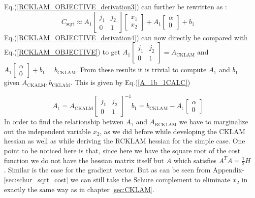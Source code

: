 Eq.(\ref{RCKLAM_OBJECTIVE_derivation3}) can further be rewritten as :
\begin{equation}
  C_\mathrm{sqrt}\approx A_1\begin{bmatrix}j_1 & j_2 \\ 0 & 1\end{bmatrix}\begin{bmatrix} x_1 \\ x_2 \end{bmatrix} + A_1\begin{bmatrix}\alpha \\ 0\end{bmatrix} + b_1
  \label{RCKLAM_OBJECTIVE_derivation4}
\end{equation}
Eq.(\ref{RCKLAM_OBJECTIVE_derivation4}) can now directly be compared with Eq.(\ref{RCKLAM_OBJECTIVE}) to get $A_1\begin{bmatrix}j_1 & j_2 \\ 0 & 1\end{bmatrix} = A_\mathrm{CKLAM}$ and $A_1\begin{bmatrix}\alpha \\ 0\end{bmatrix} + b_1 = b_\mathrm{CKLAM}$. From these results it is trivial to compute $A_1$ and $b_1$ given $A_\mathrm{CKALM} , b_\mathrm{CKLAM}$. This is given by Eq.(\ref{A_1b_1CALC})

\begin{subequations}
  \begin{equation}
    A_1 = A_\mathrm{CKALM}\begin{bmatrix}j_1 & j_2 \\ 0 & 1\end{bmatrix}^{-1}
  \end{equation}
  \begin{equation}
    b_1 = b_\mathrm{CKLAM} - A_1 \begin{bmatrix}\alpha \\ 0 \end{bmatrix}
  \end{equation}
  \label{A_1b_1CALC}
\end{subequations}
In order to find the relationship betwen $A_1$ and $A_\mathrm{RCKLAM}$ we have to marginalize out the independent variable $x_2$, as we did before while developing the CKLAM hessian as well as while deriving the RCKLAM hessian for the simple case. One point to be noticed here is that, since here we have the square root of the cost function we do not have the hessian matrix itself but $A$ which satisfies $A^TA = \frac{1}{2}H$. Similar is the case for the gradient vector. But as can be seen from Appendix-\ref{sec:schur_sqrt_cost} we can still take the Schure complement to eliminate $x_2$ in exactly the same way as in chapter \ref{sec:CKLAM}.


